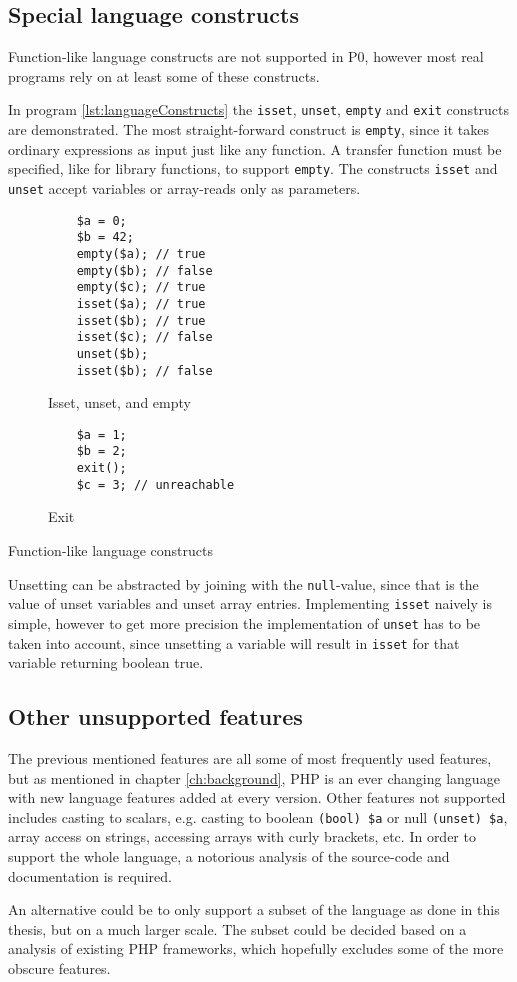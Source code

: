 \subsection{Special language constructs}

Function-like language constructs are not supported in P0, however most real programs rely on at least some of these constructs. 

In program \ref{lst:languageConstructs} the \texttt{isset}, \texttt{unset}, \texttt{empty} and \texttt{exit} constructs are demonstrated. The most straight-forward construct is \texttt{empty}, since it takes ordinary expressions as input just like any function. A transfer function must be specified, like for library functions, to support \texttt{empty}. The constructs \texttt{isset} and \texttt{unset} accept variables or array-reads only as parameters. 

\begin{program}
\begin{subfigure}[b]{.45\linewidth}
    \begin{lstlisting}
    $a = 0;
    $b = 42;
    empty($a); // true
    empty($b); // false
    empty($c); // true
    isset($a); // true
    isset($b); // true
    isset($c); // false
    unset($b);
    isset($b); // false
\end{lstlisting}
    \caption{Isset, unset, and empty}
\end{subfigure}
\begin{subfigure}[b]{.50\linewidth}
    \begin{lstlisting}
    $a = 1;
    $b = 2;
    exit();
    $c = 3; // unreachable
\end{lstlisting}
    \caption{Exit}
\end{subfigure}
\caption{Function-like language constructs}
\label{lst:languageConstructs}
\end{program}


Unsetting can be abstracted by joining with the \texttt{null}-value, since that is the value of unset variables and unset array entries. Implementing \texttt{isset} naively is simple, however to get more precision the implementation of \texttt{unset} has to be taken into account, since unsetting a variable will result in \texttt{isset} for that variable returning boolean true. 


\subsection{Other unsupported features}
The previous mentioned features are all some of most frequently used features, but as mentioned in chapter \ref{ch:background}, PHP is an ever changing language with new language features added at every version. Other features not supported includes casting to scalars, e.g. casting to boolean \texttt{(bool) \$a} or null \texttt{(unset) \$a}, array access on strings, accessing arrays with curly brackets, etc. In order to support the whole language, a notorious analysis of the source-code and documentation is required. 

An alternative could be to only support a subset of the language as done in this thesis, but on a much larger scale. The subset could be decided based on a analysis of existing PHP frameworks, which hopefully excludes some of the more obscure features.





 